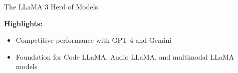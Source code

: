 \begin{frame}[allowframebreaks]{The LLaMA 3 Herd of Models}
\framebreak

    \textbf{Highlights:}
    \begin{itemize}
        \item Competitive performance with GPT-4 and Gemini
        \item Foundation for Code LLaMA, Audio LLaMA, and multimodal LLaMA models
    \end{itemize}
\end{frame}